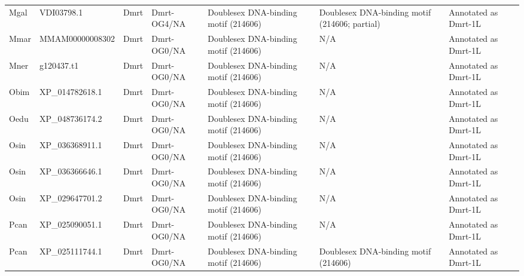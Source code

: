 \documentclass[../main.tex]{subfiles}
\begin{document}
\begin{landscape}
\begin{longtable}{lllllll}
		Mgal           & VDI03798.1            & Dmrt           & Dmrt-OG4/NA         & Doublesex DNA-binding motif (214606)        & Doublesex DNA-binding motif (214606; partial)                          & Annotated as Dmrt-1L \\
		Mmar           & MMAM00000008302       & Dmrt           & Dmrt-OG0/NA         & Doublesex DNA-binding motif (214606)        & N/A                                                                    & Annotated as Dmrt-1L \\
		Mner           & g120437.t1            & Dmrt           & Dmrt-OG0/NA         & Doublesex DNA-binding motif (214606)        & N/A                                                                    & Annotated as Dmrt-1L \\
		Obim           & XP\_014782618.1       & Dmrt           & Dmrt-OG0/NA         & Doublesex DNA-binding motif (214606)        & N/A                                                                    & Annotated as Dmrt-1L \\
		Oedu           & XP\_048736174.2       & Dmrt           & Dmrt-OG0/NA         & Doublesex DNA-binding motif (214606)        & N/A                                                                    & Annotated as Dmrt-1L \\
		Osin           & XP\_036368911.1       & Dmrt           & Dmrt-OG0/NA         & Doublesex DNA-binding motif (214606)        & N/A                                                                    & Annotated as Dmrt-1L \\
		Osin           & XP\_036366646.1       & Dmrt           & Dmrt-OG0/NA         & Doublesex DNA-binding motif (214606)        & N/A                                                                    & Annotated as Dmrt-1L \\
		Osin           & XP\_029647701.2       & Dmrt           & Dmrt-OG0/NA         & Doublesex DNA-binding motif (214606)        & N/A                                                                    & Annotated as Dmrt-1L \\
		Pcan           & XP\_025090051.1       & Dmrt           & Dmrt-OG0/NA         & Doublesex DNA-binding motif (214606)        & N/A                                                                    & Annotated as Dmrt-1L \\
		Pcan           & XP\_025111744.1       & Dmrt           & Dmrt-OG0/NA         & Doublesex DNA-binding motif (214606)        & Doublesex DNA-binding motif (214606)                                   & Annotated as Dmrt-1L \\

\end{longtable}
\end{landscape}
\end{document}
